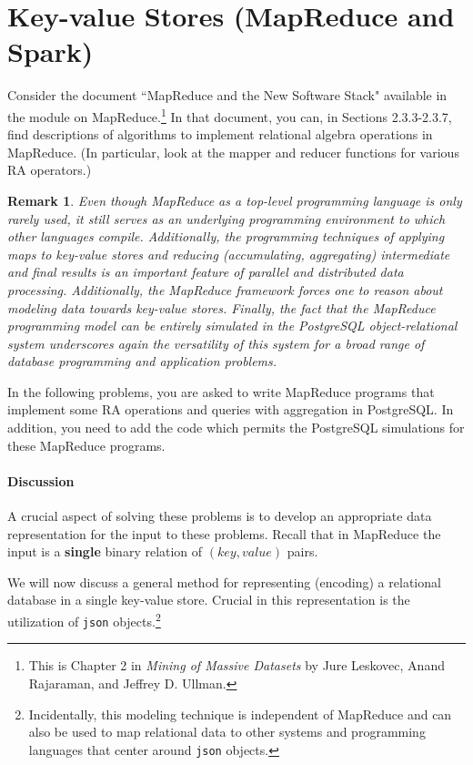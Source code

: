 \documentclass{article}
\newtheorem{remark}{Remark}
\begin{document}
\section{Key-value Stores (MapReduce and Spark)}

Consider the document ``MapReduce and the New Software Stack" available in the module on MapReduce.\footnote{This is Chapter 2 in \emph{Mining of Massive Datasets} by
Jure Leskovec, Anand Rajaraman, and Jeffrey D. Ullman.}
In that document, you can, in Sections 2.3.3-2.3.7, find descriptions of
algorithms to implement relational algebra operations in MapReduce.   
(In particular, look at the mapper and reducer functions for various RA operators.)

\begin{remark}
Even though MapReduce as a top-level programming language is only rarely used, it still serves as an underlying
programming environment to which other languages compile.    Additionally, the programming techniques of applying maps to key-value stores
and reducing (accumulating, aggregating) intermediate and final results is an important feature of parallel and distributed data processing.
Additionally, the MapReduce framework forces one to reason about modeling data towards key-value stores.
Finally, the fact that the MapReduce programming model can be entirely simulated in the PostgreSQL object-relational system underscores again the versatility of this system for a broad range of database programming and application problems.
\end{remark}

In the following problems, you are asked to write MapReduce programs
that implement some RA operations and queries with aggregation in PostgreSQL.   In addition, you need to add
the code which permits the PostgreSQL simulations for these  MapReduce programs.   

\paragraph{Discussion}
A crucial aspect of solving these problems is to develop an appropriate data representation for the input 
to these problems.   Recall that in MapReduce the input is a {\bf single} binary relation of $(key,value)$ pairs.

We will now discuss a general method for representing (encoding) a relational database in a single key-value store.
Crucial in this representation is the utilization of {\tt json} objects.\footnote{Incidentally, this modeling technique is independent of
MapReduce and can also be used to map relational data to other systems and programming languages that center around
{\tt json} objects.}
\end{document}

